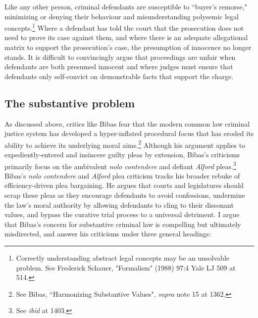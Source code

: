Like any other person, criminal defendants are susceptible to ``buyer's remorse," minimizing or denying their behaviour and misunderstanding polysemic legal concepts.\footnote{Correctly understanding abstract legal concepts may be an unsolvable problem. See Frederick Schauer, "Formalism" (1988) 97:4 Yale LJ 509 at 514.} Where a defendant has told the court that the prosecution does not need to prove its case against them, and where there is an adequate allegational matrix to support the prosecution's case, the presumption of innocence no longer stands. It is difficult to convincingly argue that proceedings are unfair when defendants are both presumed innocent and where judges must ensure that defendants only self-convict on demonstrable facts that support the charge.

\subsection{The substantive problem}

As discussed above, critics like Bibas fear that the modern common law criminal justice system has developed a hyper-inflated procedural focus that has eroded its ability to achieve its underlying moral aims.\footnote{See Bibas, ``Harmonizing Substantive Values", \textit{supra} note 15 at 1362.} Although his argument applies to expediently-entered and insincere guilty pleas by extension, Bibas's criticisms primarily focus on the ambivalent \textit{nolo contendere} and defiant \textit{Alford} pleas.\footnote{See \textit{ibid} at 1403.} Bibas's \textit{nolo contendere} and \textit{Alford} plea criticism tracks his broader rebuke of efficiency-driven plea bargaining. He argues that courts and legislatures should scrap these pleas as they encourage defendants to avoid confessions, undermine the law's moral authority by allowing defendants to cling to their dissonant values, and bypass the curative trial process to a universal detriment. I argue that Bibas's concern for substantive criminal law is compelling but ultimately misdirected, and answer his criticisms under three general headings:

